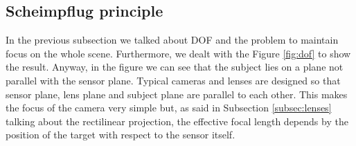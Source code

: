 \subsection{Scheimpflug principle}
In the previous subsection we talked about \acs{DOF} and the problem to maintain focus on the whole scene. Furthermore, we dealt with the Figure \ref{fig:dof} to show the result. Anyway, in the figure we can see that the subject lies on a plane not parallel with the sensor plane. Typical cameras and lenses are designed so that sensor plane, lens plane and subject plane are parallel to each other. This makes the focus of the camera very simple but, as said in Subsection \ref{subsec:lenses} talking about the rectilinear projection, the effective focal length depends by the position of the target with respect to the sensor itself. \\

